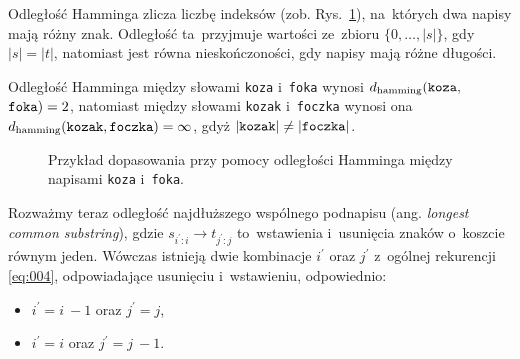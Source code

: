\documentclass{praca1}
\begin{document}
Odległość Hamminga zlicza liczbę indeksów (zob. Rys.~\ref{rys:002}), na~których dwa napisy mają różny znak. Odległość ta~przyjmuje wartości ze~zbioru $\{0,\ldots,|s|\}$, gdy $|s|=|t|$, natomiast jest równa nieskończoności, gdy napisy mają różne długości.

\begin{example}
Odległość Hamminga między słowami \verb|koza| i~\verb|foka| wynosi $d_{\mathrm{hamming}}(\verb|koza|,$ $\verb|foka|) = 2$, natomiast między słowami \verb|kozak| i~\verb|foczka| wynosi ona $d_{\mathrm{hamming}}(\verb|kozak|, \verb|foczka|) = \infty$, gdyż $|\verb|kozak| | \neq | \verb|foczka| |$.
\end{example}

\begin{figure}[width=80pt]
\centering
{}
\cprotect\caption{Przykład dopasowania przy pomocy odległości Hamminga między napisami \verb|koza| i~\verb|foka|.}\label{rys:002}
\end{figure}



Rozważmy teraz odległość najdłuższego wspólnego podnapisu (ang. \emph{longest common substring}), gdzie $s_{i^\prime:i}\rightarrow t_{j^\prime:j}$ to~wstawienia i~usunięcia znaków o~koszcie równym jeden. Wówczas istnieją dwie kombinacje $i^\prime$ oraz $j^\prime$ z~ogólnej rekurencji \eqref{eq:004}, odpowiadające usunięciu i~wstawieniu, odpowiednio:
\begin{itemize}
\item $i^\prime = i~- 1$ oraz $j^\prime = j$,
\item $i^\prime = i$ oraz $j^\prime = j~- 1$.
\end{itemize}
\end{document}
